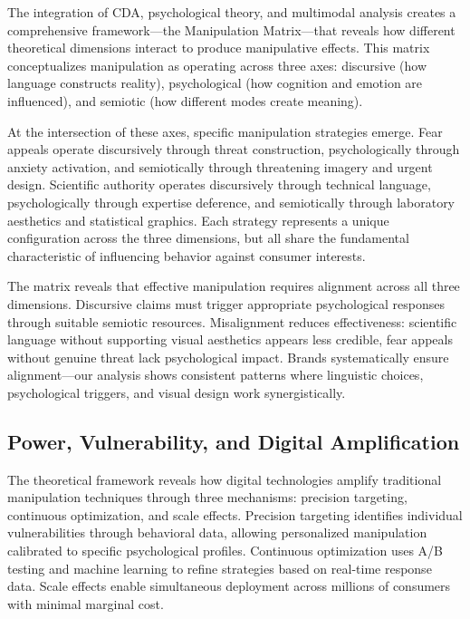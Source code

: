 The integration of CDA, psychological theory, and multimodal analysis creates a comprehensive framework—the Manipulation Matrix—that reveals how different theoretical dimensions interact to produce manipulative effects. This matrix conceptualizes manipulation as operating across three axes: discursive (how language constructs reality), psychological (how cognition and emotion are influenced), and semiotic (how different modes create meaning).

At the intersection of these axes, specific manipulation strategies emerge. Fear appeals operate discursively through threat construction, psychologically through anxiety activation, and semiotically through threatening imagery and urgent design. Scientific authority operates discursively through technical language, psychologically through expertise deference, and semiotically through laboratory aesthetics and statistical graphics. Each strategy represents a unique configuration across the three dimensions, but all share the fundamental characteristic of influencing behavior against consumer interests.

The matrix reveals that effective manipulation requires alignment across all three dimensions. Discursive claims must trigger appropriate psychological responses through suitable semiotic resources. Misalignment reduces effectiveness: scientific language without supporting visual aesthetics appears less credible, fear appeals without genuine threat lack psychological impact. Brands systematically ensure alignment—our analysis shows consistent patterns where linguistic choices, psychological triggers, and visual design work synergistically.

\subsection{Power, Vulnerability, and Digital Amplification}

The theoretical framework reveals how digital technologies amplify traditional manipulation techniques through three mechanisms: precision targeting, continuous optimization, and scale effects. Precision targeting identifies individual vulnerabilities through behavioral data, allowing personalized manipulation calibrated to specific psychological profiles. Continuous optimization uses A/B testing and machine learning to refine strategies based on real-time response data. Scale effects enable simultaneous deployment across millions of consumers with minimal marginal cost.

